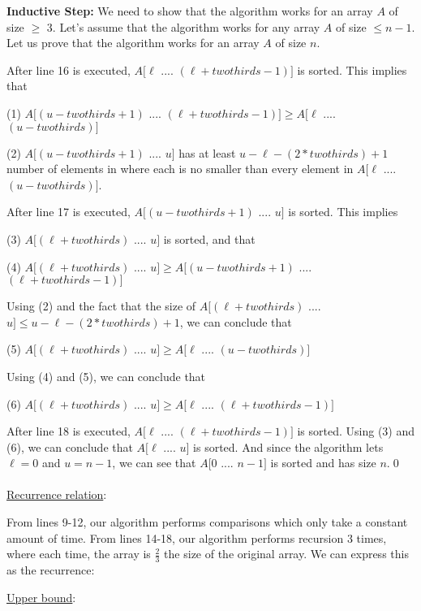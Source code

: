 \documentclass[11pt]{article}
\begin{document}
\begin{enumerate}
{\bf Inductive Step:} We need to show that the algorithm works for an array $A$ of size $\geq$ 3. Let's assume that the algorithm works for any array $A$ of size $\leq n-1$. Let us prove that the algorithm works for an array $A$ of size $n$.

After line 16 is executed, $A[\ell$ .... $(\ell + twothirds - 1)]$ is sorted. This implies that

(1) $A[(u - twothirds + 1)$ .... $(\ell + twothirds - 1)] \geq A[\ell$ .... $(u - twothirds)]$

(2) $A[(u - twothirds + 1)$ .... $u]$ has at least $u - \ell - (2*twothirds) + 1$ number of elements in where each is no smaller than every element in $A[\ell$ .... $(u - twothirds)]$.

After line 17 is executed, $A[(u - twothirds + 1)$ .... $u]$ is sorted. This implies

(3) $A[(\ell + twothirds)$ .... $u]$ is sorted, and that

(4) $A[(\ell + twothirds)$ .... $u] \geq A[(u - twothirds + 1)$ .... $(\ell + twothirds - 1)]$

Using (2) and the fact that the size of $A[(\ell + twothirds)$ .... $u] \leq u - \ell - (2*twothirds) + 1$, we can conclude that

(5) $A[(\ell + twothirds)$ .... $u] \geq A[\ell$ .... $(u - twothirds)]$

Using (4) and (5), we can conclude that

(6) $A[(\ell + twothirds)$ .... $u] \geq A[\ell$ .... $(\ell + twothirds - 1)]$

After line 18 is executed, $A[\ell$ .... $(\ell + twothirds - 1)]$ is sorted. Using (3) and (6), we can conclude that $A[\ell$ .... $u]$ is sorted. And since the algorithm lets $\ell = 0$ and $u = n - 1$, we can see that $A[0$ .... $n - 1]$ is sorted and has size $n$.\-\hspace{12cm}\qed\\
\- \\
\underline{Recurrence relation}:

From lines 9-12, our algorithm performs comparisons which only take a constant amount of time. From lines 14-18, our algorithm performs recursion 3 times, where each time, the array is $\frac{2}{3}$ the size of the original array. We can express this as the recurrence:
\begin{center}\end{center}

\underline{Upper bound}:


\end{enumerate}
\end{document}
